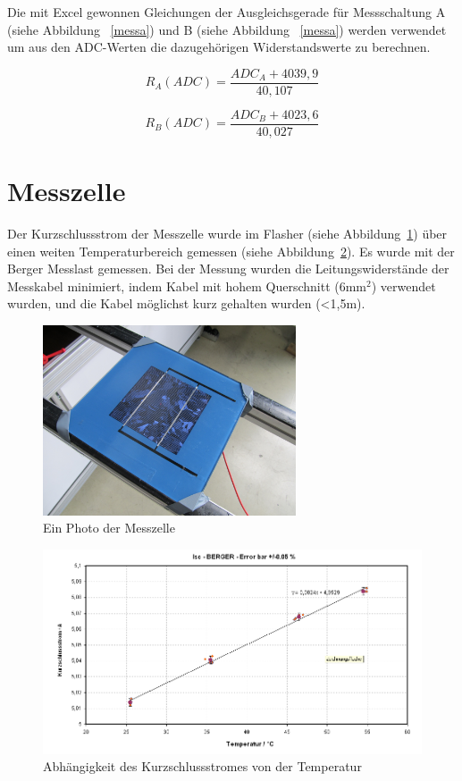 \documentclass[a4paper,bibtotoc,oneside]{scrbook}
\begin{document}
Die mit Excel gewonnen Gleichungen der Ausgleichsgerade für Messschaltung A (siehe Abbildung ~\ref{messa}) und B (siehe Abbildung ~\ref{messa}) werden verwendet um aus den ADC-Werten die dazugehörigen Widerstandswerte zu berechnen. 

  \begin{equation}
     R_A(ADC) = \frac{ADC_A + 4039,9}{40,107}
  \end{equation}
  
    \begin{equation}
     R_B(ADC) = \frac{ADC_B + 4023,6}{40,027}
  \end{equation}

 


\section{Messzelle}\thispagestyle{empty}


Der Kurzschlussstrom der Messzelle wurde im Flasher (siehe Abbildung~\ref{zelleflasher}) über einen weiten Temperaturbereich gemessen (siehe Abbildung~\ref{tempkoef}). Es wurde mit der Berger Messlast \cite{berger} gemessen. Bei der Messung wurden die Leitungswiderstände der Messkabel minimiert, indem Kabel mit hohem Querschnitt (6mm$^2$) verwendet wurden, und die Kabel möglichst kurz gehalten wurden (<1,5m).
 
\begin{figure}[htbp]
\centering
\includegraphics[width=75mm]{img/zelle.jpg}
\caption{Ein Photo der Messzelle}\label{zelleflasher}
\end{figure}

\begin{figure}[htbp]
\centering
\includegraphics[width=150mm]{img/Isc.png}
\caption{Abhängigkeit des Kurzschlussstromes von der Temperatur}\label{tempkoef}
\end{figure}
\end{document}

